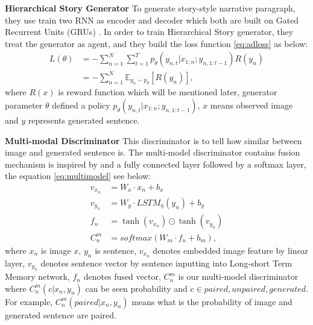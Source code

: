 \documentclass[11pt]{article}
\begin{document}
{\bf Hierarchical Story Generator} To generate story-style narrative paragraph, they use train two RNN as encoder and decoder which both are built on Gated Recurrent Units (GRUs) \cite{DBLP:journals/corr/ChungGCB14}. In order to train Hierarchical Story generator, they treat the generator as agent, and they build the loss function \ref{eq:adloss} as below:
\begin{equation}
\begin{aligned}
L(\theta) &= - \sum_{n=1}^{N} \sum_{t=1}^{T} p_{\theta} (y_{n,t}|x_{1:n};y_{n,1:t-1})R(y_n) \\
&= -\sum_{n=1}^{N} \mathds{E}_{y_{n} \backsim  p_{\theta}} [R(y_{n})], 
\end{aligned}
\label{eq:adloss}
\end{equation}
where $R(x)$ is reward function which will be mentioned later, generator parameter $\theta$ defined a policy $p_{\theta} (y_{n,t}|x_{1:n};y_{n,1:t-1})$, $x$ means observed image and $y$ represents generated sentence. 

{\bf Multi-modal Discriminator} This discriminator is to tell how similar between image and generated sentence is. The multi-model discriminator contains fusion mechanism is inspired by \cite{VQA} and a fully connected layer followed by a softmax layer, the equation \ref{eq:multimodel} see below:
\begin{equation}
\begin{aligned}
v_{x_{n}} &= W_{x} \cdot x_{n} + b_{x} \\
v_{y_{n}} &= W_{y} \cdot LSTM_{\eta}(y_{n}) + b_{y} \\
f_{n} &= \tanh(v_{x_{n}}) \odot \tanh(v_{y_{n}}) \\
C_{n}^{m} &= softmax(W_{m} \cdot f_{n} + b_{m}),  
\end{aligned}
\label{eq:multimodel}
\end{equation}
where $x_n$ is image $x$, $y_n$ is sentence, $v_{x_{n}}$ denotes embedded image feature by linear layer, $v_{y_{n}}$ denotes sentence vector by sentence inputting into Long-short Term Memory network, $f_n$ denotes fused vector, $C_{n}^{m}$ is our multi-model discriminator where $C_{n}^{m}(c|x_{n}, y_{n})$ can be seen probability and $c \in {paired, unpaired, generated}$. For example, $C_{n}^{m}(paired|x_{n}, y_{n})$ means what is the probability of image and generated sentence are paired.
\end{document}
